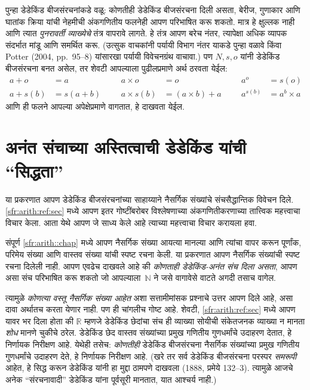 \documentclass[11pt,a4paper,openany]{book}
\theoremstyle{definition}
\newcommand{\Nat}{\mathbb{N}}
\newcommand{\Real}{\mathbb{R}}
\begin{document}
पुन्हा डेडेकिंड बीजसंरचनांकडे वळू: कोणतीही डेडेकिंड बीजसंरचना दिली
असता, बेरीज, गुणाकार आणि घातांक क्रिया यांची नेहमीची अंकगणितीय फलनेही
आपण परिभाषित करू शकतो. मात्र हे क्षुल्लक नाही आणि त्यात
\emph{पुनरावर्ती व्याख्येचे} तंत्र वापरावे लागते. हे तंत्र आपण बरेच नंतर,
त्यापेक्षा अधिक व्यापक संदर्भात मांडू आणि समर्थित करू.
(उत्सुक वाचकांनी पर्यायी विभाग नंतर याकडे पुन्हा
वळावे किंवा Potter (2004, pp.~95--8) यांसारखा पर्यायी विवेचनग्रंथ
वाचावा.) पण $N, s, o$ यांनी डेडेकिंड बीजसंरचना बनत असेल, तर शेवटी
आपल्याला पुढीलप्रमाणे अर्थ ठरवता येईल:
\begin{align*}
	{a} + {o} &= {a} & & & {a} \times {o} &= {o} & & & {a}^{o} &= s(o)\\
{a} + {s}({b}) &= {s}({a}+{b}) &&& {a} \times {s}({b}) &= ({a}\times {b}) + {a}  & & & {a}^{{s}({b})} &= {a}^{b} \times {a}
\end{align*}
आणि ही फलने आपल्या अपेक्षेप्रमाणे वागतात, हे दाखवता येईल.









\section{अनंत संचाच्या अस्तित्वाची
डेडेकिंड यांची ``सिद्धता''}\label{sfr:infinite:dedekindsproof:sec}

या प्रकरणात आपण डेडेकिंड बीजसंरचनांच्या साहाय्याने नैसर्गिक संख्यांचे
संचसैद्धान्तिक विवेचन दिले. \ref{sfr:arith:ref:sec} मध्ये आपण इतर
गोष्टींबरोबर विश्लेषणाच्या अंकगणितीकरणाच्या तात्त्विक महत्त्वाचा विचार
केला. आता येथे आपण जे साध्य केले आहे त्याच्या महत्त्वाचा विचार करायला हवा.

संपूर्ण \ref{sfr:arith::chap} मध्ये आपण नैसर्गिक संख्या आयत्या
मानल्या आणि त्यांचा वापर करून पूर्णांक, परिमेय संख्या आणि वास्तव संख्या
यांची स्पष्ट रचना केली. या प्रकरणात आपण नैसर्गिक संख्यांची स्पष्ट रचना
दिलेली नाही. आपण एवढेच दाखवले आहे की \emph{कोणताही डेडेकिंड-अनंत संच
दिला असता}, आपण असा संच परिभाषित करू शकतो जो आपल्याला~$\Nat$ ने जसे
वागावेसे वाटते अगदी तसाच वागेल.

त्यामुळे \emph{कोणत्या वस्तू नैसर्गिक संख्या आहेत} अशा सत्तामीमांसक
प्रश्नाचे उत्तर आपण दिले आहे, असा दावा अर्थातच करता येणार नाही. पण ही
चांगलीच गोष्ट आहे. शेवटी, \ref{sfr:arith:ref:sec} मध्ये आपण यावर
भर दिला होता की $\Real$ म्हणजे डेडेकिंड छेदांचा संच ही व्याख्या सोयीची
संकेतजनक व्याख्या न मानता \emph{शोध} मानणे चुकीचे ठरेल. डेडेकिंड छेद
वास्तव संख्यांच्या प्रमुख गणितीय गुणधर्मांचे उदाहरण देतात, हे निर्णायक
निरीक्षण आहे. येथेही तसेच: \emph{कोणतीही} डेडेकिंड बीजसंरचना नैसर्गिक
संख्यांच्या प्रमुख गणितीय गुणधर्मांचे उदाहरण देते, हे निर्णायक निरीक्षण
आहे. (खरे तर सर्व डेडेकिंड बीजसंरचना परस्पर \emph{समरूपी} आहेत, हे
सिद्ध करून डेडेकिंड यांनी हा मुद्दा ठामपणे दाखवला
(1888, प्रमेये 132--3). त्यामुळे आजचे अनेक
``संरचनावादी'' डेडेकिंड यांना पूर्वसूरी मानतात, यात आश्चर्य नाही.)
\end{document}
